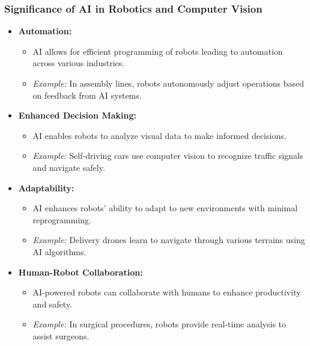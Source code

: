 \documentclass[aspectratio=169]{beamer}
\begin{document}
\begin{frame}[fragile]
    \frametitle{Significance of AI in Robotics and Computer Vision}
    
    \begin{itemize}
        \item \textbf{Automation:} 
            \begin{itemize}
                \item AI allows for efficient programming of robots leading to automation across various industries.
                \item \textit{Example:} In assembly lines, robots autonomously adjust operations based on feedback from AI systems.
            \end{itemize}
        
        \item \textbf{Enhanced Decision Making:} 
            \begin{itemize}
                \item AI enables robots to analyze visual data to make informed decisions.
                \item \textit{Example:} Self-driving cars use computer vision to recognize traffic signals and navigate safely.
            \end{itemize}
        
        \item \textbf{Adaptability:} 
            \begin{itemize}
                \item AI enhances robots' ability to adapt to new environments with minimal reprogramming.
                \item \textit{Example:} Delivery drones learn to navigate through various terrains using AI algorithms.
            \end{itemize}
        
        \item \textbf{Human-Robot Collaboration:} 
            \begin{itemize}
                \item AI-powered robots can collaborate with humans to enhance productivity and safety.
                \item \textit{Example:} In surgical procedures, robots provide real-time analysis to assist surgeons.
            \end{itemize}
    \end{itemize}
\end{frame}
\end{document}
